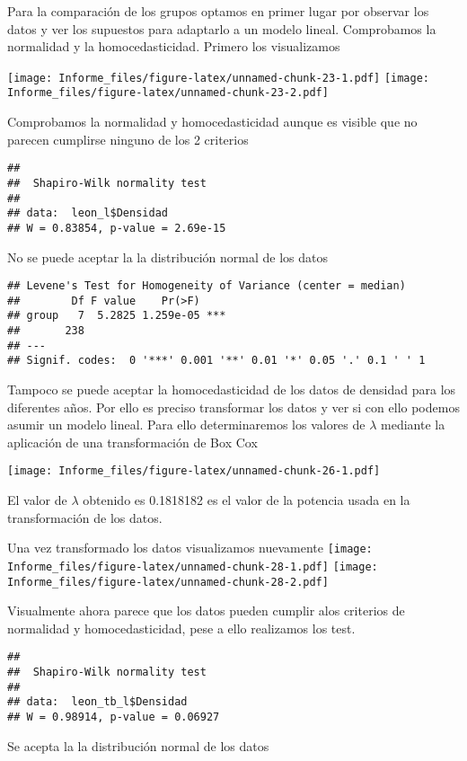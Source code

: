 \documentclass[
]{article}
\begin{document}
Para la comparación de los grupos optamos en primer lugar por observar
los datos y ver los supuestos para adaptarlo a un modelo lineal.
Comprobamos la normalidad y la homocedasticidad. Primero los
visualizamos

\texttt{[image: Informe\_files/figure-latex/unnamed-chunk-23-1.pdf]}
\texttt{[image: Informe\_files/figure-latex/unnamed-chunk-23-2.pdf]}

Comprobamos la normalidad y homocedasticidad aunque es visible que no
parecen cumplirse ninguno de los 2 criterios

\begin{verbatim}
## 
##  Shapiro-Wilk normality test
## 
## data:  leon_l$Densidad
## W = 0.83854, p-value = 2.69e-15
\end{verbatim}

No se puede aceptar la la distribución normal de los datos

\begin{verbatim}
## Levene's Test for Homogeneity of Variance (center = median)
##        Df F value    Pr(>F)    
## group   7  5.2825 1.259e-05 ***
##       238                      
## ---
## Signif. codes:  0 '***' 0.001 '**' 0.01 '*' 0.05 '.' 0.1 ' ' 1
\end{verbatim}

Tampoco se puede aceptar la homocedasticidad de los datos de densidad
para los diferentes años. Por ello es preciso transformar los datos y
ver si con ello podemos asumir un modelo lineal. Para ello
determinaremos los valores de \(\lambda\) mediante la aplicación de una
transformación de Box Cox

\texttt{[image: Informe\_files/figure-latex/unnamed-chunk-26-1.pdf]}

El valor de \(\lambda\) obtenido es 0.1818182 es el valor de la potencia
usada en la transformación de los datos.

Una vez transformado los datos visualizamos nuevamente
\texttt{[image: Informe\_files/figure-latex/unnamed-chunk-28-1.pdf]}
\texttt{[image: Informe\_files/figure-latex/unnamed-chunk-28-2.pdf]}

Visualmente ahora parece que los datos pueden cumplir alos criterios de
normalidad y homocedasticidad, pese a ello realizamos los test.

\begin{verbatim}
## 
##  Shapiro-Wilk normality test
## 
## data:  leon_tb_l$Densidad
## W = 0.98914, p-value = 0.06927
\end{verbatim}

Se acepta la la distribución normal de los datos
\end{document}
